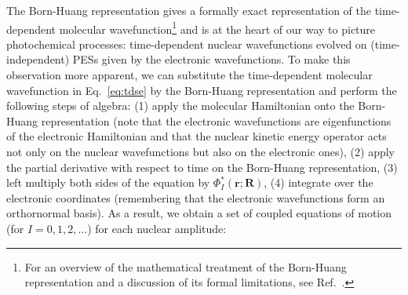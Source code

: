 \documentclass[9pt,bestpractices]{livecoms}
\begin{document}
The Born-Huang representation gives a formally exact representation of the time-dependent molecular wavefunction\footnote{For an overview of the mathematical treatment of the Born-Huang representation and a discussion of its formal limitations, see Ref.~.} and is at the heart of our way to picture photochemical processes: time-dependent nuclear wavefunctions evolved on (time-independent) PESs given by the electronic wavefunctions. To make this observation more apparent, we can substitute the time-dependent molecular wavefunction in Eq.~\eqref{eq:tdse} by the Born-Huang representation and perform the following steps of algebra: (1) apply the molecular Hamiltonian onto the Born-Huang representation (note that the electronic wavefunctions are eigenfunctions of the electronic Hamiltonian and that the nuclear kinetic energy operator acts not only on the nuclear wavefunctions but also on the electronic ones), (2) apply the partial derivative with respect to time on the Born-Huang representation, (3) left multiply both sides of the equation by $\Phi_I^\ast(\mathbf{r};\mathbf{R})$, (4) integrate over the electronic coordinates (remembering that the electronic wavefunctions form an orthornormal basis). As a result, we obtain a set of coupled equations of motion (for $I=0, 1, 2, \dots$) for each nuclear amplitude:
\end{document}
